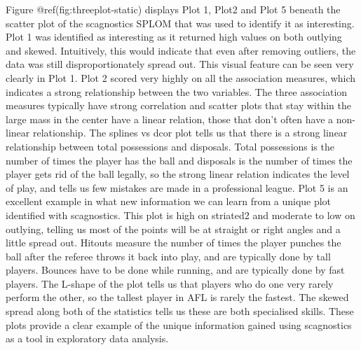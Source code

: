 Figure @ref(fig:threeplot-static) displays Plot 1, Plot2 and Plot 5
beneath the scatter plot of the scagnostics SPLOM that was used to
identify it as interesting. Plot 1 was identified as interesting as it
returned high values on both outlying and skewed. Intuitively, this
would indicate that even after removing outliers, the data was still
disproportionately spread out. This visual feature can be seen very
clearly in Plot 1. Plot 2 scored very highly on all the association
measures, which indicates a strong relationship between the two
variables. The three association measures typically have strong
correlation and scatter plots that stay within the large mass in the
center have a linear relation, those that don't often have a non-linear
relationship. The splines vs dcor plot tells us that there is a strong
linear relationship between total possessions and disposals. Total
possessions is the number of times the player has the ball and disposals
is the number of times the player gets rid of the ball legally, so the
strong linear relation indicates the level of play, and tells us few
mistakes are made in a professional league. Plot 5 is an excellent
example in what new information we can learn from a unique plot
identified with scagnostics. This plot is high on striated2 and moderate
to low on outlying, telling us most of the points will be at straight or
right angles and a little spread out. Hitouts measure the number of
times the player punches the ball after the referee throws it back into
play, and are typically done by tall players. Bounces have to be done
while running, and are typically done by fast players. The L-shape of
the plot tells us that players who do one very rarely perform the other,
so the tallest player in AFL is rarely the fastest. The skewed spread
along both of the statistics tells us these are both specialised skills.
These plots provide a clear example of the unique information gained
using scagnostics as a tool in exploratory data analysis.

